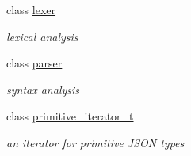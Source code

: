 \begin{DoxyCompactItemize}
class \hyperlink{classnlohmann_1_1basic__json_1_1lexer}{lexer}
\begin{DoxyCompactList}\small\item\em lexical analysis \end{DoxyCompactList}\item 
class \hyperlink{classnlohmann_1_1basic__json_1_1parser}{parser}
\begin{DoxyCompactList}\small\item\em syntax analysis \end{DoxyCompactList}\item 
class \hyperlink{classnlohmann_1_1basic__json_1_1primitive__iterator__t}{primitive\+\_\+iterator\+\_\+t}
\begin{DoxyCompactList}\small\item\em an iterator for primitive J\+S\+ON types \end{DoxyCompactList}\end{DoxyCompactItemize}
